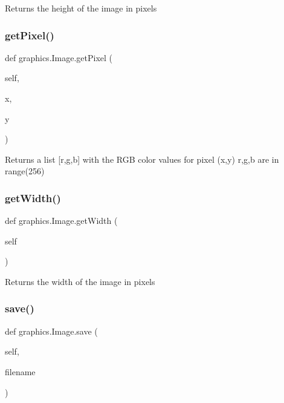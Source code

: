 \begin{DoxyVerb}Returns the height of the image in pixels\end{DoxyVerb}
 \mbox{\label{classgraphics_1_1_image_a69deca3f65e378be239eb1ba837d06f8}} 
\subsubsection{\texorpdfstring{get\+Pixel()}{getPixel()}}
{\footnotesize\ttfamily def graphics.\+Image.\+get\+Pixel (\begin{DoxyParamCaption}\item[{}]{self,  }\item[{}]{x,  }\item[{}]{y }\end{DoxyParamCaption})}

\begin{DoxyVerb}Returns a list [r,g,b] with the RGB color values for pixel (x,y)
r,g,b are in range(256)\end{DoxyVerb}
 \mbox{\label{classgraphics_1_1_image_aff8e62ceeb4265e4d17ce852903c9ae3}} 
\subsubsection{\texorpdfstring{get\+Width()}{getWidth()}}
{\footnotesize\ttfamily def graphics.\+Image.\+get\+Width (\begin{DoxyParamCaption}\item[{}]{self }\end{DoxyParamCaption})}

\begin{DoxyVerb}Returns the width of the image in pixels\end{DoxyVerb}
 \mbox{\label{classgraphics_1_1_image_ace518e9286a3bc0f81c7f1029c394104}} 
\subsubsection{\texorpdfstring{save()}{save()}}
{\footnotesize\ttfamily def graphics.\+Image.\+save (\begin{DoxyParamCaption}\item[{}]{self,  }\item[{}]{filename }\end{DoxyParamCaption})}

